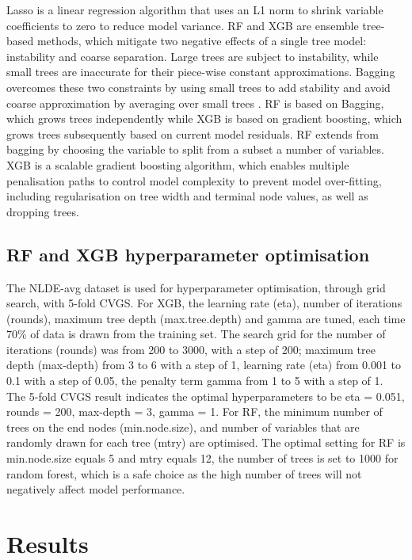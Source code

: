 \documentclass{article}
\begin{document}
Lasso is a linear regression algorithm that uses an L1 norm to shrink variable coefficients to zero to reduce model variance. RF and XGB are ensemble tree-based methods, which mitigate two negative effects of a single tree model: instability and coarse separation. Large trees are subject to instability, while small trees are inaccurate for their piece-wise constant approximations. Bagging overcomes these two constraints by using small trees to add stability and avoid coarse approximation by averaging over small trees \citep{friedman2001greedy}. RF is based on Bagging, which grows trees independently while XGB is based on gradient boosting, which grows trees subsequently based on current model residuals. RF extends from bagging by choosing the variable to split from a subset a number of variables. XGB is a scalable gradient boosting algorithm, which enables multiple penalisation paths to control model complexity to prevent model over-fitting, including regularisation on tree width and terminal node values, as well as dropping trees.  

\subsection{RF and XGB hyperparameter optimisation}

The NLDE-avg dataset is used for hyperparameter optimisation, through grid search, with 5-fold CVGS. For XGB, the learning rate (eta), number of iterations (rounds), maximum tree depth (max.tree.depth) and gamma are tuned, each time 70\% of data is drawn from the training set. The search grid for the number of iterations (rounds) was from 200 to 3000, with a step of 200; maximum tree depth (max-depth) from 3 to 6 with a step of 1, learning rate (eta) from 0.001 to 0.1 with a step of 0.05, the penalty term gamma \citep{xgboost} from 1 to 5 with a step of 1. The 5-fold CVGS result indicates the optimal hyperparameters to be eta = 0.051, rounds = 200, max-depth = 3, gamma = 1. For RF, the minimum number of trees on the end nodes (min.node.size), and number of variables that are randomly drawn for each tree (mtry) are optimised. The optimal setting for RF is min.node.size equals 5 and mtry equals 12, the number of trees is set to 1000 for random forest, which is a safe choice as the high number of trees will not negatively affect model performance.
 


\section{Results}
\end{document}
